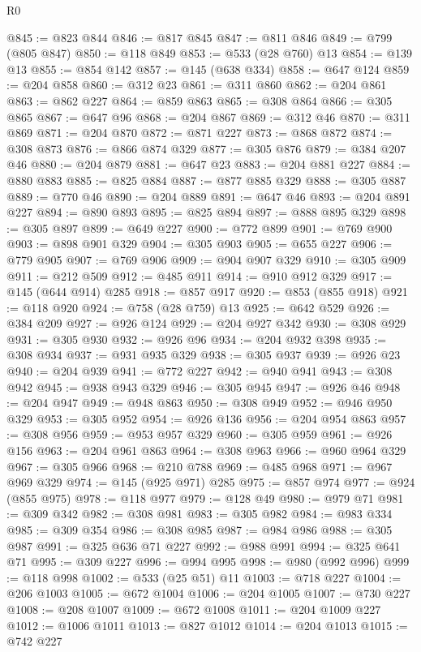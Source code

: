 \begin{lexlean}{R0}
\begin{coremodule}
@845 := @823 @844
@846 := @817 @845
@847 := @811 @846
@849 := @799 (@805 @847)
@850 := @118 @849
@853 := @533 (@28 @760) @13
@854 := @139 @13
@855 := @854 @142
@857 := @145 (@638 @334)
@858 := @647 @124
@859 := @204 @858
@860 := @312 @23
@861 := @311 @860
@862 := @204 @861
@863 := @862 @227
@864 := @859 @863
@865 := @308 @864
@866 := @305 @865
@867 := @647 @96
@868 := @204 @867
@869 := @312 @46
@870 := @311 @869
@871 := @204 @870
@872 := @871 @227
@873 := @868 @872
@874 := @308 @873
@876 := @866 @874 @329
@877 := @305 @876
@879 := @384 @207 @46
@880 := @204 @879
@881 := @647 @23
@883 := @204 @881 @227
@884 := @880 @883
@885 := @825 @884
@887 := @877 @885 @329
@888 := @305 @887
@889 := @770 @46
@890 := @204 @889
@891 := @647 @46
@893 := @204 @891 @227
@894 := @890 @893
@895 := @825 @894
@897 := @888 @895 @329
@898 := @305 @897
@899 := @649 @227
@900 := @772 @899
@901 := @769 @900
@903 := @898 @901 @329
@904 := @305 @903
@905 := @655 @227
@906 := @779 @905
@907 := @769 @906
@909 := @904 @907 @329
@910 := @305 @909
@911 := @212 @509
@912 := @485 @911
@914 := @910 @912 @329
@917 := @145 (@644 @914) @285
@918 := @857 @917
@920 := @853 (@855 @918)
@921 := @118 @920
@924 := @758 (@28 @759) @13
@925 := @642 @529
@926 := @384 @209
@927 := @926 @124
@929 := @204 @927 @342
@930 := @308 @929
@931 := @305 @930
@932 := @926 @96
@934 := @204 @932 @398
@935 := @308 @934
@937 := @931 @935 @329
@938 := @305 @937
@939 := @926 @23
@940 := @204 @939
@941 := @772 @227
@942 := @940 @941
@943 := @308 @942
@945 := @938 @943 @329
@946 := @305 @945
@947 := @926 @46
@948 := @204 @947
@949 := @948 @863
@950 := @308 @949
@952 := @946 @950 @329
@953 := @305 @952
@954 := @926 @136
@956 := @204 @954 @863
@957 := @308 @956
@959 := @953 @957 @329
@960 := @305 @959
@961 := @926 @156
@963 := @204 @961 @863
@964 := @308 @963
@966 := @960 @964 @329
@967 := @305 @966
@968 := @210 @788
@969 := @485 @968
@971 := @967 @969 @329
@974 := @145 (@925 @971) @285
@975 := @857 @974
@977 := @924 (@855 @975)
@978 := @118 @977
@979 := @128 @49
@980 := @979 @71
@981 := @309 @342
@982 := @308 @981
@983 := @305 @982
@984 := @983 @334
@985 := @309 @354
@986 := @308 @985
@987 := @984 @986
@988 := @305 @987
@991 := @325 @636 @71 @227
@992 := @988 @991
@994 := @325 @641 @71
@995 := @309 @227
@996 := @994 @995
@998 := @980 (@992 @996)
@999 := @118 @998
@1002 := @533 (@25 @51) @11
@1003 := @718 @227
@1004 := @206 @1003
@1005 := @672 @1004
@1006 := @204 @1005
@1007 := @730 @227
@1008 := @208 @1007
@1009 := @672 @1008
@1011 := @204 @1009 @227
@1012 := @1006 @1011
@1013 := @827 @1012
@1014 := @204 @1013
@1015 := @742 @227

\end{coremodule}
\end{lexlean}
